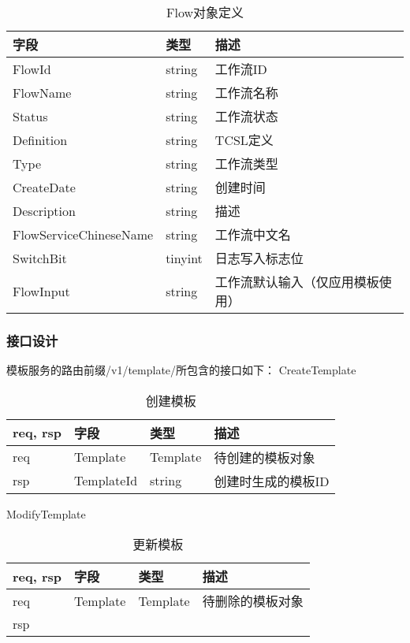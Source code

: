 \begin{table}[H]
    \centering
    \caption{Flow对象定义}
    \label{tab:strcut-template}
    \begin{tabular}{lll}
        \toprule
        字段 & 类型 & 描述 \\
        \midrule
        FlowId &       string & 工作流ID \\
        FlowName &       string & 工作流名称\\
        Status &                string & 工作流状态\\
        Definition &            string & TCSL定义\\
        Type &                  string & 工作流类型\\
        CreateDate &            string & 创建时间\\
        Description &           string & 描述\\
        FlowServiceChineseName & string & 工作流中文名\\
        SwitchBit &             tinyint & 日志写入标志位\\
        FlowInput &             string & 工作流默认输入（仅应用模板使用）\\
        \bottomrule
    \end{tabular}
\end{table}

\subsubsection{接口设计}

模板服务的路由前缀/v1/template/所包含的接口如下：
CreateTemplate
\begin{table}[H]
    \centering
    \caption{创建模板}
    \label{tab:design-interface-template-create}
    \begin{tabular}{llll}
        \toprule
        req, rsp   & 字段 & 类型 & 描述 \\
        \midrule
        req & Template & Template & 待创建的模板对象 \\ \hline
        rsp & TemplateId & string & 创建时生成的模板ID\\
        \bottomrule
    \end{tabular}
\end{table}

ModifyTemplate
\begin{table}[H]
    \centering
    \caption{更新模板}
    \label{tab:design-interface-template-modify}
    \begin{tabular}{llll}
        \toprule
        req, rsp   & 字段 & 类型 & 描述 \\
        \midrule
        req & Template & Template & 待删除的模板对象 \\ \hline
        rsp & & & \\
        \bottomrule
    \end{tabular}
\end{table}

